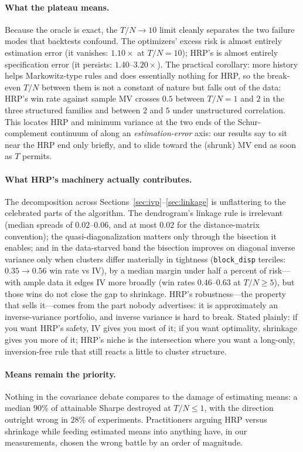 \documentclass[11pt]{article}
\newcommand{\TN}{T/N}
\begin{document}
\paragraph{What the plateau means.} Because the oracle is exact, the
$\TN\to10$ limit cleanly separates the two failure modes that backtests
confound. The optimizers' excess risk is almost entirely estimation error
(it vanishes: $1.10\times$ at $\TN=10$); HRP's is almost entirely
specification error (it persists: $1.40$--$3.20\times$). The practical
corollary: more history helps Markowitz-type rules and does essentially
nothing for HRP, so the break-even $\TN$ between them is not a constant of
nature but falls out of the data: HRP's win rate against sample MV crosses
$0.5$ between $\TN=1$ and $2$ in the three structured families and between
$2$ and $5$ under unstructured correlation. This locates HRP
and minimum variance at the two ends of the Schur-complement continuum of
\citet{cotton2024schur} along an \emph{estimation-error} axis: our results
say to sit near the HRP end only briefly, and to slide toward the
(shrunk) MV end as soon as $T$ permits.

\paragraph{What HRP's machinery actually contributes.} The decomposition
across Sections~\ref{sec:ivp}--\ref{sec:linkage} is unflattering to the
celebrated parts of the algorithm. The dendrogram's linkage rule is
irrelevant (median spreads of $0.02$--$0.06$, and at most $0.02$ for the
distance-matrix convention); the quasi-diagonalization matters only
through the bisection it enables; and in the data-starved band the bisection
improves on diagonal inverse variance only when clusters differ materially
in tightness (\texttt{block\_disp} terciles: $0.35\to0.56$ win rate vs IV),
by a median margin under half a percent of risk---with ample data it edges
IV more broadly (win rates $0.46$--$0.63$ at $\TN\ge5$), but those wins do
not close the gap to shrinkage. HRP's robustness---the property that
sells it---comes from the part nobody advertises: it is approximately an
inverse-variance portfolio, and inverse variance is hard to break. Stated
plainly: if you want HRP's safety, IV gives you most of it; if you want
optimality, shrinkage gives you more of it; HRP's niche is the intersection
where you want a long-only, inversion-free rule that still reacts a little
to cluster structure.

\paragraph{Means remain the priority.} Nothing in the covariance debate
compares to the damage of estimating means: a median $90\%$ of attainable
Sharpe destroyed at $\TN\le1$, with the direction outright wrong in $28\%$
of experiments. Practitioners arguing HRP versus shrinkage while feeding
estimated means into anything have, in our measurements, chosen the wrong
battle by an order of magnitude.
\end{document}
